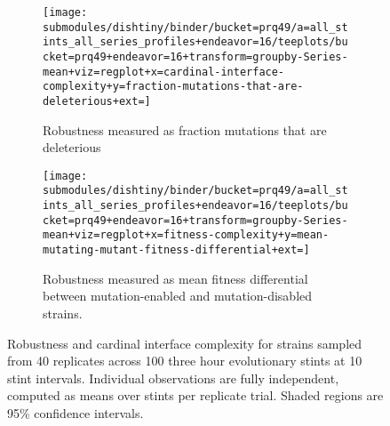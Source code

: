 \begin{figure}
\begin{center}

\begin{subfigure}[b]{\textwidth}
\centering
\texttt{[image: submodules/dishtiny/binder/bucket=prq49/a=all\_stints\_all\_series\_profiles+endeavor=16/teeplots/bucket=prq49+endeavor=16+transform=groupby-Series-mean+viz=regplot+x=cardinal-interface-complexity+y=fraction-mutations-that-are-deleterious+ext=]}%
\caption{
Robustness measured as fraction mutations that are deleterious
}
\label{fig:robustness-vs-cardinal-interface-complexity-fraction-mutations-that-are-deleterious}
\end{subfigure}

\begin{subfigure}[b]{\columnwidth}
\centering
\texttt{[image: submodules/dishtiny/binder/bucket=prq49/a=all\_stints\_all\_series\_profiles+endeavor=16/teeplots/bucket=prq49+endeavor=16+transform=groupby-Series-mean+viz=regplot+x=fitness-complexity+y=mean-mutating-mutant-fitness-differential+ext=]}
\caption{
Robustness measured as mean fitness differential between mutation-enabled and mutation-disabled strains.
}
\label{fig:robustness-vs-cardinal-interface-complexity-mean-mutating-mutant-fitness-differential}
\end{subfigure}

\caption{
Robustness and cardinal interface complexity for strains sampled from 40 replicates across 100 three hour evolutionary stints at 10 stint intervals.
Individual observations are fully independent, computed as means over stints per replicate trial.
Shaded regions are 95\% confidence intervals.
}
\label{fig:robustness-vs-cardinal-interface-complexity}

\end{center}
\end{figure}
